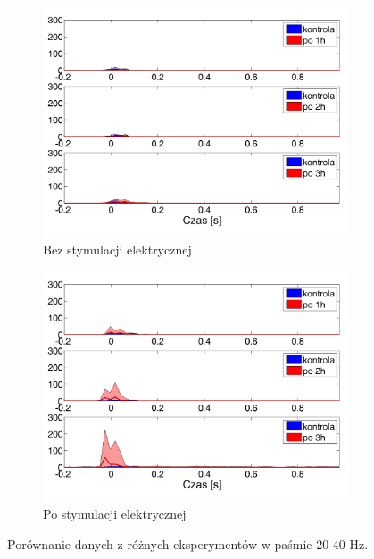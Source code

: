 \documentclass{pracamgr_2}
\begin{document}
\begin{figure}[h]
	\begin{subfigure}{.5\textwidth}
		\centering
		\includegraphics[width=1.\linewidth]{kontrola15_20-40_z_CxC8_do_SC4.png}
		\caption{Bez stymulacji elektrycznej}
		\label{rys:kon_CxC_SC}
	\end{subfigure}%
	\begin{subfigure}{.5\textwidth}
		\centering
		\includegraphics[width=1.\linewidth]{beta3_20-40_z_CxC5_do_SC4.png}
		\caption{Po stymulacji elektrycznej}
		\label{rys:beta_CxC_SC}
	\end{subfigure}
	\caption{Porównanie danych z różnych eksperymentów w paśmie 20-40 Hz.}
	\label{rys:20-40_CxC_SC}
\end{figure}
\FloatBarrier
\end{document}
